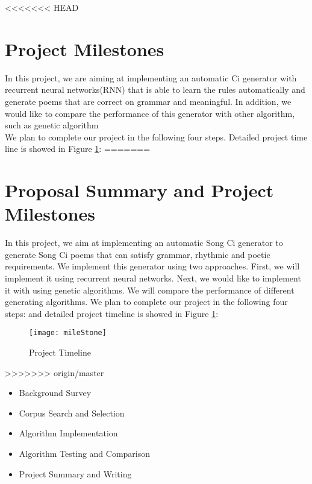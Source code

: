 <<<<<<< HEAD
\section{Project Milestones}
In this project, we are aiming at implementing an automatic Ci generator with recurrent neural networks(RNN) that is able to learn the rules automatically and generate poems that are correct on grammar and meaningful. In addition, we would like to compare the performance of this generator with other algorithm, such as genetic algorithm\\

We plan to complete our project in the following four steps. Detailed project time line is showed in Figure \ref{fig:projecttimeline}:
=======
\section{Proposal Summary and Project Milestones}
In this project, we aim at implementing an automatic Song Ci generator to generate Song Ci poems that can satisfy grammar, rhythmic and poetic requirements.
%
We implement this generator using two approaches. First, we will implement it using recurrent neural networks.
%
Next, we would like to implement it with using genetic algorithms.
%
We will compare the performance of different generating algorithms.
%
We plan to complete our project in the following four steps:
and detailed project timeline is showed in Figure \ref{fig:projecttimeline}:
\begin{figure}[htbp]
	\centering
	\texttt{[image: mileStone]}
	\caption{Project Timeline}
	\label{fig:projecttimeline}	
\end{figure}
>>>>>>> origin/master
\begin{itemize}
\item Background Survey
\item Corpus Search and Selection
\item Algorithm Implementation
\item Algorithm Testing and Comparison
\item Project Summary and Writing
\end{itemize}

